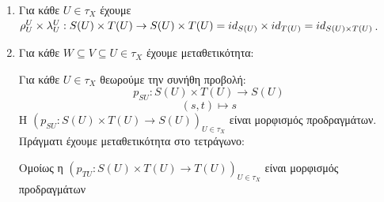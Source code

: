 \begin{enumerate}
    \item Για κάθε $U \in \tau_X$ έχουμε $\rho^U_U \times \lambda^U_U : S(U)\times T(U) \rightarrow S(U) \times T(U) = id_{S(U)} \times id_{T(U)} = id_{S(U)\times T(U)}$.
    \item Για κάθε $W \subseteq V \subseteq U \in \tau_X$ έχουμε μεταθετικότητα:
    \begin{figure}[H]
        \centering
    \end{figure}
    \noindent Για κάθε $U\in \tau_X$ θεωρούμε την συνήθη προβολή:
    $$p_{SU}:S(U)\times T(U)\longrightarrow S(U)$$
    $$(s,t) \longmapsto s$$ Η $(p_{SU}:S(U)\times T(U)\rightarrow S(U))_{U\in\tau_X}$ είναι μορφισμός προδραγμάτων. Πράγματι έχουμε μεταθετικότητα στο τετράγωνο:

    \begin{figure}[H]
        \centering
    \end{figure}

    \noindent Ομοίως η $(p_{TU}:S(U)\times T(U)\rightarrow T(U))_{U\in \tau_X}$ είναι μορφισμός προδραγμάτων
\end{enumerate}



